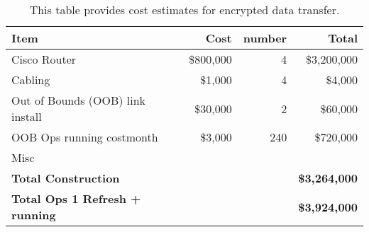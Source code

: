 \tiny \begin{longtable} {|l|r|r|r|} \caption{This table provides cost estimates for encrypted data transfer. \label{tab:ipsec}}\\ 
\hline 
\textbf{Item}&\textbf{Cost}&\textbf{number}&\textbf{Total} \\ \hline
{Cisco Router }&{\$800,000}&{4}&{\$3,200,000} \\ \hline
{Cabling}&{\$1,000}&{4}&{\$4,000} \\ \hline
{Out of Bounds (OOB) link  install}&{\$30,000}&{2}&{\$60,000} \\ \hline
{OOB Ops running cost\/month}&{\$3,000}&{240}&{\$720,000} \\ \hline
{Misc}&&& \\ \hline
\textbf{Total Construction}&\textbf{}&\textbf{}&\textbf{\$3,264,000} \\ \hline
\textbf{Total Ops 1 Refresh  + running }&\textbf{}&\textbf{}&\textbf{\$3,924,000} \\ \hline
\end{longtable} \normalsize
